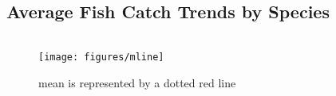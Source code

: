 \documentclass[
]{book}
\begin{document}
\hypertarget{average-fish-catch-trends-by-species}{%
\subsection{Average Fish Catch Trends by Species}\label{average-fish-catch-trends-by-species}}

\begin{columns-nocenter}

\begin{column}

\begin{figure}
\texttt{[image: figures/mline]} \caption{mean is represented by a dotted red line}\label{fig:unnamed-chunk-31}
\end{figure}

\end{column}

\begin{column}

\end{column}

\begin{column}

\end{column}

\end{columns-nocenter}
\end{document}
